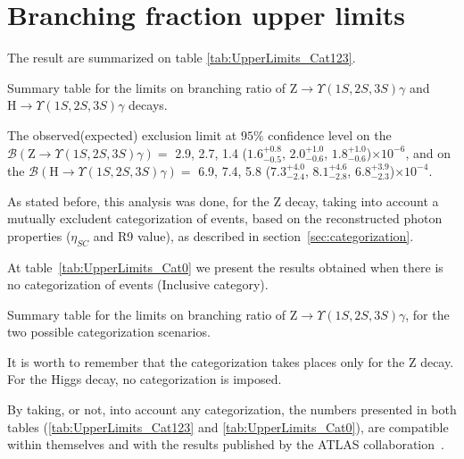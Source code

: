 \section{Branching fraction upper limits}
\label{sec:results}
The result are summarized on table \ref{tab:UpperLimits_Cat123}.

\begin{table}[ht]
\begin{center}
% 

\caption{Summary table for the limits on branching ratio of $\mathrm{Z}\to\Upsilon(1S,2S,3S)\gamma$ and $\mathrm{H}\to\Upsilon(1S,2S,3S)\gamma$ decays.}
\label{tab:UpperLimits_Cat123}
\end{center}
\end{table}

The observed(expected) exclusion limit at $95\%$ confidence level on the $\mathcal{B}(\mathrm{Z}\to\Upsilon(1S,2S,3S)\gamma)=$ 2.9, 2.7, 1.4 ($1.6^{+0.8}_{-0.5}$,  $2.0^{+1.0}_{-0.6}$, $1.8^{+1.0}_{-0.6}$)$\times 10^{-6}$, and on the $\mathcal{B}(\mathrm{H}\to\Upsilon(1S,2S,3S)\gamma)=$ 6.9, 7.4, 5.8 ($7.3^{+4.0}_{-2.4}$,  $8.1^{+4.6}_{-2.8}$, $6.8^{+3.9}_{-2.3}$)$\times 10^{-4}$.



As stated before, this analysis was done, for the Z decay, taking into account a mutually excludent categorization of events, based on the reconstructed photon properties ($\eta_{SC}$ and R9 value), as described in section~\ref{sec:categorization}. 

At table~\ref{tab:UpperLimits_Cat0} we present the results obtained when there is no categorization of events (Inclusive category).

\begin{table}[ht]
\begin{center}
% 

\caption{Summary table for the limits on branching ratio of $\mathrm{Z}\to\Upsilon(1S,2S,3S)\gamma$, for the two possible categorization scenarios.}
\label{tab:UpperLimits_Cat0}
\end{center}
\end{table}


It is worth to remember that the categorization takes places only for the Z decay. For the Higgs decay, no categorization is imposed.

By taking, or not, into account any categorization, the numbers presented in both tables (\ref{tab:UpperLimits_Cat123} and \ref{tab:UpperLimits_Cat0}), are compatible within themselves and with the results published by the ATLAS collaboration~\cite{Aaboud_2018}.


\clearpage
